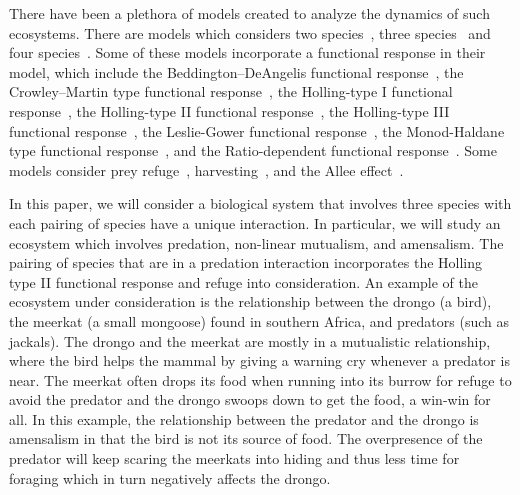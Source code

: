 \documentclass[]{interact}
\theoremstyle{plain}%
\theoremstyle{definition}
\theoremstyle{remark}
\numberwithin{equation}{section}
\begin{document}
There have been a plethora of models created to analyze the dynamics of such ecosystems.
There are models which considers two species~\cite{GHOSH2017110, CHEN20122790, YU2012208167, HUANG2006672, AZIZALAOUI20031069, XIAO200614, SEN201212, CANTRELL2001206, CHEN20092905, CHEN2010246, KAR2005681, CHATTOPADHYAY1996287, KAR2003125}, three species~\cite{GAKKHAR201654, PANJA2022100153, MENG2014810, ALIDOUSTI2020109688, PEET2005491, SARWARDI2012133, PRIYADARSHI20133202, GAKKHAR2005105, GAKKHAR2007808, Mukherjee2013, DHAKNEMUNDE2012, CHATTOPADHYAY200345, PANJAMONDAL2015, PANJA2017389, KHAJANCHI2017193, JANA2017350} and four species~\cite{JANA2021100942}.
Some of these models incorporate a functional response in their model, which include the Beddington–DeAngelis functional response~\cite{CANTRELL2001206}, the Crowley–Martin type functional response~\cite{MENG2014810}, the Holling-type I functional response~\cite{JANA2021100942, Mukherjee2013, CHATTOPADHYAY200345}, the Holling-type II functional response~\cite{GAKKHAR201654, PANJA2022100153, JANA2021100942, GHOSH2017110, YU2012208167, HUANG2006672, AZIZALAOUI20031069, CHEN2010246, SARWARDI2012133, PRIYADARSHI20133202, GAKKHAR2005105, GAKKHAR2007808, Mukherjee2013, CHATTOPADHYAY200345, PANJAMONDAL2015, JANA2017350}, the Holling-type III functional response~\cite{CHATTOPADHYAY200345}, the Leslie-Gower functional response~\cite{YU2012208167, AZIZALAOUI20031069, PRIYADARSHI20133202}, the Monod-Haldane type functional response~\cite{ALIDOUSTI2020109688}, and the Ratio-dependent functional response~\cite{XIAO200614, SEN201212, CANTRELL2001206, KHAJANCHI2017193}.
Some models consider prey refuge~\cite{GAKKHAR201654, PANJA2022100153, GHOSH2017110, CHEN20122790, HUANG2006672, CHEN20092905, CHEN2010246, KAR2005681, SARWARDI2012133, Mukherjee2013, KHAJANCHI2017193, JANA2017350}, harvesting~\cite{XIAO200614, KAR2003125, PANJA2017389}, and the Allee effect~\cite{SEN201212}.

In this paper, we will consider a biological system that involves three species with each pairing of species have a unique interaction.
In particular, we will study an ecosystem which involves predation, non-linear mutualism, and amensalism.
The pairing of species that are in a predation interaction incorporates the Holling type II functional response and refuge into consideration.
An example of the ecosystem under consideration is the relationship between the drongo (a bird), the meerkat (a small mongoose) found in southern Africa, and predators (such as jackals).
The drongo and the meerkat are mostly in a mutualistic relationship, where the bird helps the mammal by giving a warning cry whenever a predator is near.
The meerkat often drops its food when running into its burrow for refuge to avoid the predator and the drongo swoops down to get the food, a win-win for all.
In this example, the relationship between the predator and the drongo is amensalism in that the bird is not its source of food.
The overpresence of the predator will keep scaring the meerkats into hiding and thus less time for foraging which in turn negatively affects the drongo.
\end{document}
